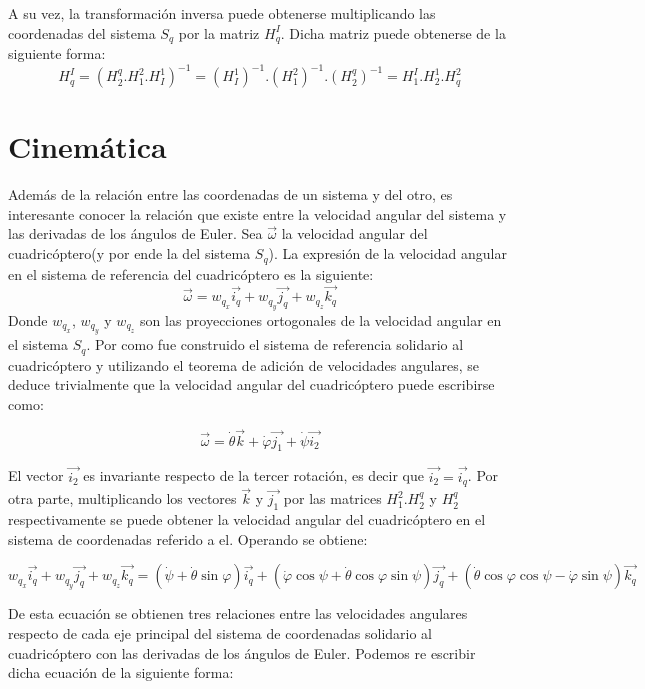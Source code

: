 \documentclass[main]{subfiles}
\begin{document}
 A su vez, la transformaci\'on inversa puede obtenerse multiplicando las coordenadas del sistema $S_q$ por la matriz $H_q^I$. Dicha matriz puede obtenerse de la siguiente forma:
 $$ H_q^I=(H_2^q.H_1^2.H_I^1)^{-1}=(H_I^1)^{-1}.(H_1^2)^{-1}.(H_2^q)^{-1}=H_1^I.H_2^1.H_q^2$$
 
\section{Cinem\'atica}
Adem\'as de la relaci\'on entre las coordenadas de un sistema y del otro, es interesante conocer la relaci\'on que existe entre la velocidad angular del sistema y las derivadas de los \'angulos de Euler. Sea $\vec{\omega}$ la velocidad angular del cuadric\'optero(y por ende la del sistema $S_q$). La expresi\'on de la velocidad angular en el sistema de referencia del cuadric\'optero es la siguiente:
$$
\vec{\omega}=w_{q_x}\vec{i_q}+w_{q_y}\vec{j_q}+w_{q_z}\vec{k_q}
$$ 
Donde $w_{q_x}$, $w_{q_y}$ y $w_{q_z}$ son las proyecciones ortogonales de la velocidad angular en el sistema $S_q$.
Por como fue construido el sistema de referencia solidario al cuadric\'optero y utilizando el teorema de adici\'on de velocidades angulares, se deduce trivialmente que la velocidad angular del cuadric\'optero puede escribirse como:

$$
\vec{\omega}=\dot{\theta}\vec{k}+\dot{\varphi}\vec{j_1}+\dot{\psi}\vec{i_2}
$$

El vector $\vec{i_2}$ es invariante respecto de la tercer rotaci\'on, es decir que $\vec{i_2}=\vec{i_q}$. Por otra parte, multiplicando los vectores $\vec{k}$ y $\vec{j_1}$ por las matrices $H_1^2.H_2^q$ y $H_2^q$ respectivamente se puede obtener la velocidad angular del cuadric\'optero en el sistema de coordenadas referido a el. Operando se obtiene:

\begin{footnotesize}

$$
w_{q_x}\vec{i_q}+w_{q_y}\vec{j_q}+w_{q_z}\vec{k_q}= (\dot{\psi}  +    \dot{\theta}\sin\varphi)\vec{i_q}+(\dot{\varphi}\cos\psi + \dot{\theta}\cos\varphi \sin\psi)\vec{j_q}+(\dot{\theta}\cos\varphi \cos\psi -  \dot{\varphi}\sin\psi)\vec{k_q}
$$


\end{footnotesize}

De esta ecuaci\'on se obtienen tres relaciones entre las velocidades angulares respecto de cada eje principal del sistema de coordenadas solidario al  cuadric\'optero con las derivadas de los \'angulos de Euler. Podemos re escribir dicha ecuaci\'on de la siguiente forma:
\end{document}
